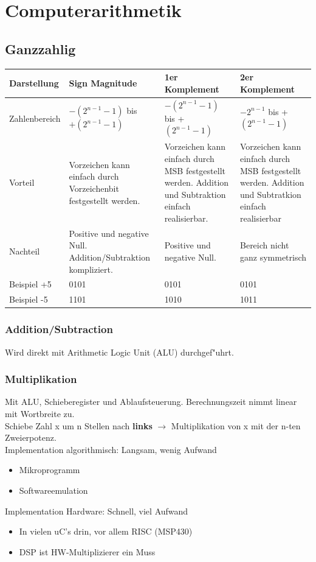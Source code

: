 \section{Computerarithmetik}

\subsection{Ganzzahlig}
\begin{tabular}{|p{3cm}|p{4.5cm}|p{4.5cm}|p{4.5cm}|}
	\hline
	Darstellung & Sign Magnitude & 1er Komplement & 2er Komplement\\
	\hline
	Zahlenbereich & $-(2^{n-1}-1)$ bis $+(2^{n-1}-1)$ & $-(2^{n-1}-1)$ bis +$(2^{n-1}-1)$ & $-2^{n-1}$ bis +$(2^{n-1}-1)$\\
	\hline
	Vorteil & Vorzeichen kann einfach durch Vorzeichenbit festgestellt werden. & Vorzeichen kann einfach durch MSB festgestellt werden. Addition und Subtraktion einfach realisierbar. & Vorzeichen kann einfach durch MSB festgestellt werden. Addition und Subtratkion einfach realisierbar \\ 
	\hline
	Nachteil & Positive und negative Null. Addition/Subtraktion kompliziert. & Positive und negative Null. & Bereich nicht ganz symmetrisch\\
	\hline
	Beispiel +5 & 0101 & 0101 & 0101 \\
	Beispiel -5 & 1101 & 1010 & 1011 \\
	\hline
\end{tabular}
\subsubsection{Addition/Subtraction}
Wird direkt mit Arithmetic Logic Unit (ALU) durchgef"uhrt.
\subsubsection{Multiplikation}
Mit ALU, Schieberegister und Ablaufsteuerung. Berechnungszeit nimmt linear mit Wortbreite zu.\\ Schiebe Zahl x um n Stellen nach \textbf{links} $\rightarrow$ Multiplikation von x mit der n-ten Zweierpotenz. \\
Implementation algorithmisch: Langsam, wenig Aufwand
\begin{itemize}
	\item Mikroprogramm
	\item Softwareemulation
\end{itemize}
Implementation Hardware: Schnell, viel Aufwand
\begin{itemize}
	\item In vielen uC's drin, vor allem RISC (MSP430)
	\item DSP ist HW-Multiplizierer ein Muss
\end{itemize}

